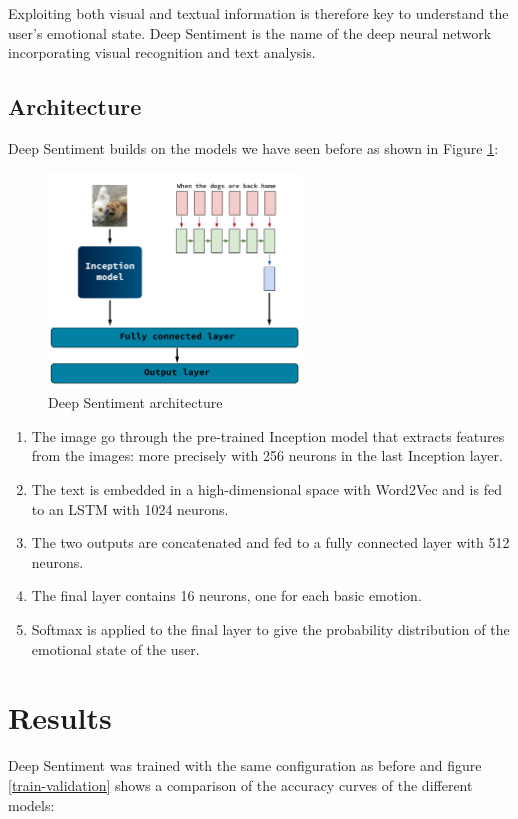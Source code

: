 \documentclass{article} %
\begin{document}
Exploiting both visual and textual information is therefore key to understand the user's emotional state. Deep Sentiment is the name of the deep neural network incorporating visual recognition and text analysis.

\subsection{Architecture}
Deep Sentiment builds on the models we have seen before as shown in Figure \ref{deep-sentiment}:

\begin{figure}[H]
    \centering
    \includegraphics[width=0.6\textwidth]{Images/deep-sentiment.png}
    \caption{Deep Sentiment architecture}
    \label{deep-sentiment}
\end{figure}

\begin{enumerate}
    \item The image go through the pre-trained Inception model that extracts features from the images: more precisely with 256 neurons in the last Inception 
    layer.
    \item The text is embedded in a high-dimensional space with Word2Vec and is fed to an LSTM with 1024 neurons.
    \item The two outputs are concatenated and fed to a fully connected layer with 512 neurons. 
    \item The final layer contains 16 neurons, one for each basic emotion.
    \item Softmax is applied to the final layer to give the probability distribution of the emotional state of the user.
\end{enumerate}

\section{Results}
Deep Sentiment was trained with the same configuration as before and figure \ref{train-validation} shows a comparison of the accuracy curves of the different models:
\end{document}
